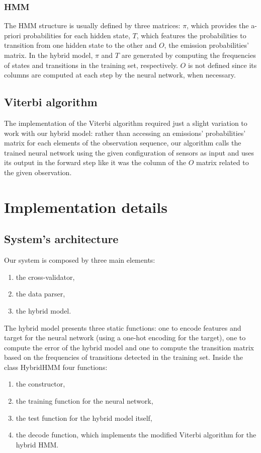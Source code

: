 \documentclass[10pt,a4paper]{article}
\begin{document}
	\subsubsection{HMM}
	The HMM structure is usually defined by three matrices: $\pi$, which provides the a-priori probabilities for each hidden state, $T$, which features the probabilities to transition from one hidden state to the other and  $O$, the emission probabilities' matrix. In the hybrid model, $\pi$ and $T$ are generated by computing the frequencies of states and transitions in the training set, respectively. $O$ is not defined since its columns are computed at each step by the neural network, when necessary. 
	\subsection{Viterbi algorithm}
	The implementation of the Viterbi algorithm required just a slight variation to work with our hybrid model: rather than accessing an emissions' probabilities' matrix for each elements of the observation sequence, our algorithm calls the trained neural network using the given configuration of sensors as input and uses its output in the forward step like it was the column of the $O$ matrix related to the given observation.
	
	\section{Implementation details}
	\subsection{System's architecture}
	Our system is composed by three main elements:
	\begin{enumerate}
		\item the cross-validator,
		\item the data parser,
		\item the hybrid model.
	\end{enumerate}
The hybrid model presents three static functions: one to encode features and target for the neural network (using a one-hot encoding for the target), one to compute the error of the hybrid model and one to compute the transition matrix based on the frequencies of transitions detected in the training set. Inside the class HybridHMM four functions:
\begin{enumerate}
	\item the constructor,
	\item the training function for the neural network,
	\item the test function for the hybrid model itself,
	\item the decode function, which implements the modified Viterbi algorithm for the hybrid HMM.
\end{enumerate}
\end{document}
